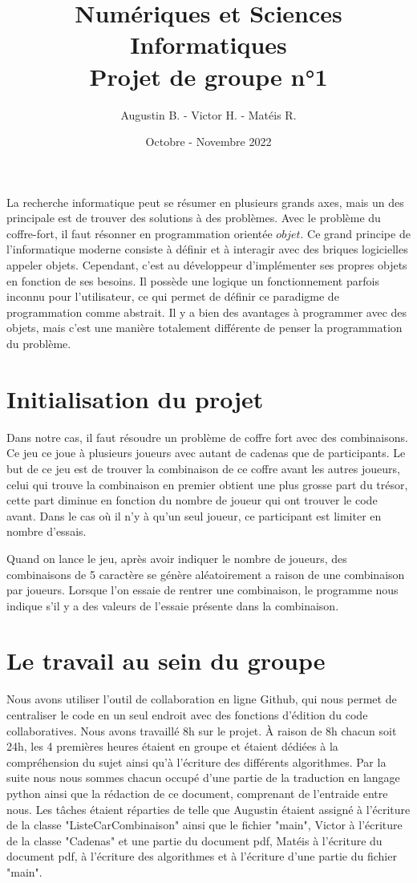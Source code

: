 \documentclass{article}
\title{Numériques et Sciences Informatiques \\ Projet de groupe n°1}
\author{Augustin B. - Victor H. - Matéis R.}
\date{Octobre - Novembre 2022}
\begin{document}
    \maketitle
    
    La recherche informatique peut se résumer en plusieurs grands axes, mais un des principale est de trouver des solutions à des problèmes. Avec le problème du coffre-fort, il faut résonner en programmation orientée $objet$. Ce grand principe de l'informatique moderne consiste à définir et à interagir avec des briques logicielles appeler objets. Cependant, c'est au développeur d'implémenter ses propres objets en fonction de ses besoins. Il possède une logique un fonctionnement parfois inconnu pour l'utilisateur, ce qui permet de définir ce paradigme de programmation comme abstrait. Il y a bien des avantages à programmer avec des objets, mais c'est une manière totalement différente de penser la programmation du problème. \newline
    
    \part{Initialisation du projet}
	Dans notre cas, il faut résoudre un problème de coffre fort avec des combinaisons. Ce jeu ce joue à plusieurs joueurs avec autant de cadenas que de participants. Le but de ce jeu est de trouver la combinaison de ce coffre avant les autres joueurs, celui qui trouve la combinaison en premier obtient une plus grosse part du trésor, cette part diminue en fonction du nombre de joueur qui ont trouver le code avant. Dans le cas où il n'y à qu'un seul joueur, ce participant est limiter en nombre d'essais. \newline
    
    Quand on lance le jeu, après avoir indiquer le nombre de joueurs, des combinaisons de 5 caractère se génère aléatoirement a raison de une combinaison par joueurs. Lorsque l'on essaie de rentrer une combinaison, le programme nous indique s'il y a des valeurs de l'essaie présente dans la combinaison. \newline

	
	\part{Le travail au sein du groupe}
	Nous avons utiliser l'outil de collaboration en ligne Github, qui nous permet de centraliser le code en un seul endroit avec des fonctions d'édition du code collaboratives. Nous avons travaillé 8h sur le projet. À raison de 8h chacun soit 24h, les 4 premières heures étaient en groupe et étaient dédiées à la compréhension du sujet ainsi qu'à l'écriture des différents algorithmes. Par la suite nous nous sommes chacun occupé d'une partie de la traduction en langage python ainsi que la rédaction de ce document, comprenant de l'entraide entre nous. Les tâches étaient réparties de telle que Augustin étaient assigné à l'écriture de la classe "ListeCarCombinaison" ainsi que le fichier "main", Victor à l'écriture de la classe "Cadenas" et une partie du document pdf, Matéis à l'écriture du document pdf, à l'écriture des algorithmes et à l'écriture d'une partie du fichier "main".
	
\end{document}
